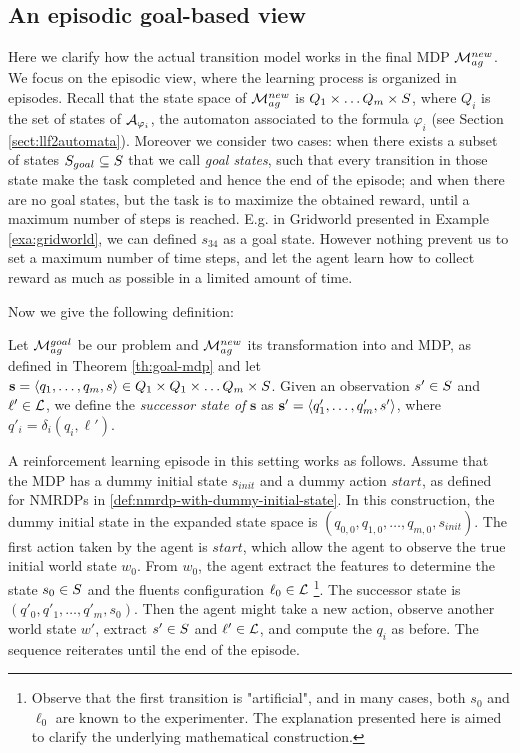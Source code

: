 \subsection{An episodic goal-based view}
Here we clarify how the actual transition model works in the final MDP $\mathcal{M}_{ag}^{new}$. We focus on the episodic view, where the learning process is organized in episodes.
Recall that the state space of $\mathcal{M}_{ag}^{new}$ is $Q_1\times \dots Q_m \times S$, where $Q_i$ is the set of states of $\mathcal{A}_{\varphi_i}$, the automaton associated to the \LLf formula $\varphi_i$ (see Section \ref{sect:llf2automata}). 
Moreover we consider two cases: when there exists a subset of states $S_{goal} \subseteq S$ that we call \emph{goal states}, such that every transition in those state make the task completed and hence the end of the episode; and when there are no goal states, but the task is to maximize the obtained reward, until a maximum number of steps is reached. E.g. in Gridworld presented in Example \ref{exa:gridworld}, we can defined $s_{34}$ as a goal state. However nothing prevent us to set a maximum number of time steps, and let the agent learn how to collect reward as much as possible in a limited amount of time.

Now we give the following definition:
\begin{definition}
	Let $\mathcal{M}_{ag}^{goal}$ be our problem and $\mathcal{M}_{ag}^{new}$ its transformation into and MDP, as defined in Theorem \ref{th:goal-mdp} and let $\mathbf{s}=\langle q_1, \dots, q_m, s \rangle\in Q_1\times Q_1\times \dots Q_m \times S$. Given an observation $s'\in S$ and $\ell'\in\mathcal{L}$, we define the \emph{successor state of} $\mathbf{s}$ as $\mathbf{s'}=\langle q'_1, \dots, q'_m, s' \rangle$, where $q'_i = \delta_i(q_i, \ell')$.
\end{definition}
	
A reinforcement learning episode in this setting works as follows. Assume that the MDP has a dummy initial state $s_{init}$ and a dummy action $start$, as defined for NMRDPs in \ref{def:nmrdp-with-dummy-initial-state}. In this construction, the dummy initial state in the expanded state space is $(q_{0,0}, q_{1,0}, \dots, q_{m, 0}, s_{init})$. 
The first action taken by the agent is $start$, which allow the agent to observe the true initial world state $w_0$. 
From $w_0$, the agent extract the features to determine the state $s_0\in S$ and the fluents configuration $\ell_0\in \mathcal{L}$
\footnote{Observe that the first transition is "artificial", and in many cases, both $s_0$ and $\ell_0$ are known to the experimenter. The explanation presented here is aimed to clarify the underlying mathematical construction.}. The successor state is $(q'_{0}, q'_{1}, \dots, q'_{m}, s_0)$. Then the agent might take a new action, observe another world state $w'$, extract $s'\in S$ and $\ell'\in\mathcal{L}$, and compute the $q_i$ as before. The sequence reiterates until the end of the episode.

